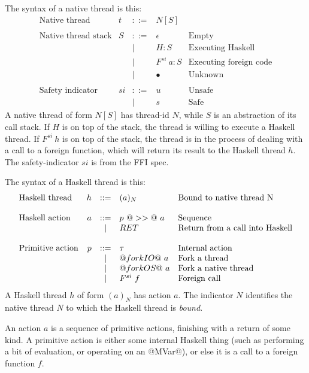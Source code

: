 \documentclass{article}
\newcommand{\hcall}{H}
\newcommand{\fcall}[2]{F^{#1}~#2}
\newcommand{\ret}[1]{RET~#1}
\begin{document}
The syntax of a native thread is this:
$$
\begin{array}{lrcll}
\mbox{Native thread} &  t & ::= & N[S] \\
\\
\mbox{Native thread stack} &  S & ::= & \epsilon & \mbox{Empty}\\
        & & | & \hcall : S  & \mbox{Executing Haskell} \\
        & & | & \fcall{si}{a} : S & \mbox{Executing foreign code} \\
        & & | & \bullet & \mbox{Unknown}\\
\\
\mbox{Safety indicator} &  si & ::= & u & \mbox{Unsafe} \\
        & & | & s & \mbox{Safe}
\end{array}
$$
A native thread of form $N[S]$ has thread-id $N$, while $S$ is
an abstraction of its call stack.  If $\hcall$ is on top of the stack,
the thread is willing to execute a Haskell thread.
If $\fcall{si}{h}$ is
on top of the stack, the thread is in the process of dealing with a call
to a foreign function, which will return its result to the Haskell thread
$h$.  The safety-indicator $si$ is from the FFI spec.

The syntax of a Haskell thread is this:
$$
\begin{array}{lrcll}
\mbox{Haskell thread} &  h & ::= & (a)_{N} & \mbox{Bound to native thread N} \\
\\
\mbox{Haskell action} &  a & ::= & p ~@>>@~ a  & \mbox{Sequence} \\
        & & | & \ret  & \mbox{Return from a call into Haskell} \\
\\
\mbox{Primitive action} &  p & ::= & \tau & \mbox{Internal action} \\
        & & | & @forkIO@~a & \mbox{Fork a thread} \\
        & & | & @forkOS@~a & \mbox{Fork a native thread} \\
        & & | & \fcall{si}{f} & \mbox{Foreign call} 
\end{array}
$$
A Haskell thread $h$ of form $(a)_{N}$ has action $a$.  The indicator
$N$ identifies the native thread $N$ to which the Haskell thread is \emph{bound}.

An action $a$ is a sequence of primitive actions, finishing with a 
return of some kind.  A primitive action is either some internal Haskell
thing (such as performing a bit of evaluation, or operating on an @MVar@),
or else it is a call to a foreign function $f$.
\end{document}
